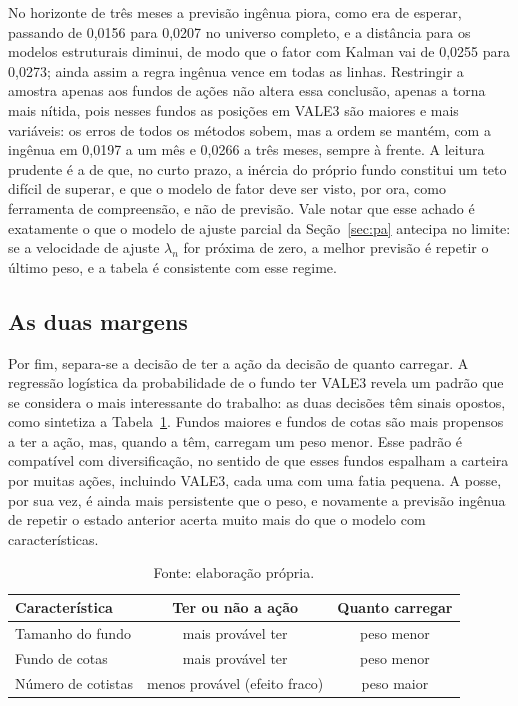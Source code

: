 \documentclass[12pt,a4paper]{article}
\begin{document}
No horizonte de três meses a previsão ingênua piora, como era de esperar, passando de 0,0156 para
0,0207 no universo completo, e a distância para os modelos estruturais diminui, de modo que o
fator com Kalman vai de 0,0255 para 0,0273; ainda assim a regra ingênua vence em todas as linhas.
Restringir a amostra apenas aos fundos de ações não altera essa conclusão, apenas a torna mais
nítida, pois nesses fundos as posições em VALE3 são maiores e mais variáveis: os erros de todos os
métodos sobem, mas a ordem se mantém, com a ingênua em 0,0197 a um mês e 0,0266 a três meses,
sempre à frente. A leitura prudente é a de que, no curto prazo, a inércia do próprio fundo
constitui um teto difícil de superar, e que o modelo de fator deve ser visto, por ora, como
ferramenta de compreensão, e não de previsão. Vale notar que esse achado é exatamente o que o
modelo de ajuste parcial da Seção~\ref{sec:pa} antecipa no limite: se a velocidade de ajuste
$\lambda_n$ for próxima de zero, a melhor previsão é repetir o último peso, e a tabela é
consistente com esse regime.

\subsection{As duas margens}

Por fim, separa-se a decisão de ter a ação da decisão de quanto carregar. A regressão logística da
probabilidade de o fundo ter VALE3 revela um padrão que se considera o mais interessante do
trabalho: as duas decisões têm sinais opostos, como sintetiza a Tabela~\ref{tab:margens}. Fundos
maiores e fundos de cotas são mais propensos a ter a ação, mas, quando a têm, carregam um peso
menor. Esse padrão é compatível com diversificação, no sentido de que esses fundos espalham a
carteira por muitas ações, incluindo VALE3, cada uma com uma fatia pequena. A posse, por sua vez,
é ainda mais persistente que o peso, e novamente a previsão ingênua de repetir o estado anterior
acerta muito mais do que o modelo com características.

\begin{table}[h]\centering\small
\caption{Sinais opostos entre a decisão de ter a ação e a decisão de quanto carregar.}
\label{tab:margens}
\begin{tabular}{@{}lcc@{}}
\toprule
Característica & Ter ou não a ação & Quanto carregar \\
\midrule
Tamanho do fundo   & mais provável ter & peso menor \\
Fundo de cotas     & mais provável ter & peso menor \\
Número de cotistas & menos provável (efeito fraco) & peso maior \\
\bottomrule
\end{tabular}
\caption*{\footnotesize Fonte: elaboração própria.}
\end{table}
\end{document}
